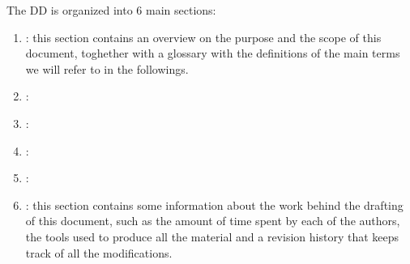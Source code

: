 The DD is organized into 6 main sections:

\begin{enumerate}
\item {\textbf{}}: this section contains an overview on the purpose and the scope of this document, toghether with a glossary with the definitions of the main terms we will refer to in the followings.
\item {\textbf{}}: 
\item {\textbf{}}:
\item {\textbf{}}: 
\item {\textbf{}}: 
\item {\textbf{}}: this section contains some information about the work behind the drafting of this
document, such as the amount of time spent by each of the authors, the tools used to produce all
the material and a revision history that keeps track of all the modifications.
\end{enumerate}
